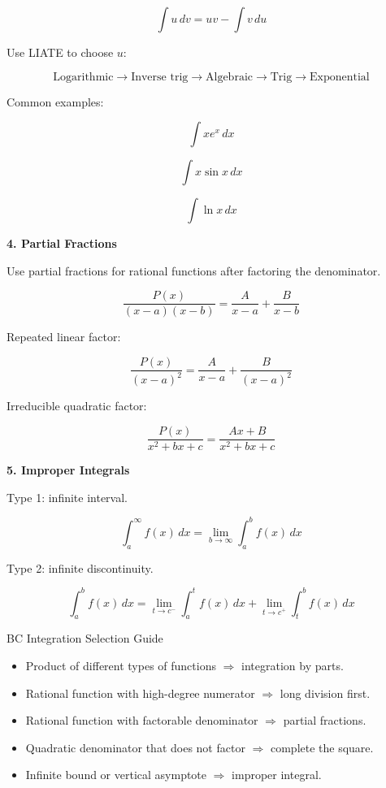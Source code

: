 \documentclass[11pt]{article}
\newcommand{\subtopic}[1]{
\vspace{0.45em}
\textcolor{novelPurpleDark}{\textbf{#1}}
}
\begin{document}
\[
\int u\,dv=uv-\int v\,du
\]

Use LIATE to choose \(u\):

\[
\text{Logarithmic} \to \text{Inverse trig} \to \text{Algebraic} \to \text{Trig} \to \text{Exponential}
\]

Common examples:

\[
\int x e^x\,dx
\]

\[
\int x\sin x\,dx
\]

\[
\int \ln x\,dx
\]

\subtopic{4. Partial Fractions}

Use partial fractions for rational functions after factoring the denominator.

\[
\frac{P(x)}{(x-a)(x-b)}
=
\frac{A}{x-a}+\frac{B}{x-b}
\]

Repeated linear factor:

\[
\frac{P(x)}{(x-a)^2}
=
\frac{A}{x-a}+\frac{B}{(x-a)^2}
\]

Irreducible quadratic factor:

\[
\frac{P(x)}{x^2+bx+c}
=
\frac{Ax+B}{x^2+bx+c}
\]

\subtopic{5. Improper Integrals}

Type 1: infinite interval.

\[
\int_a^\infty f(x)\,dx
=
\lim_{b\to\infty}\int_a^b f(x)\,dx
\]

Type 2: infinite discontinuity.

\[
\int_a^b f(x)\,dx
=
\lim_{t\to c^-}\int_a^t f(x)\,dx+
\lim_{t\to c^+}\int_t^b f(x)\,dx
\]

\begin{warningbox}{BC Integration Selection Guide}
\begin{itemize}[leftmargin=1.5em]
\item Product of different types of functions \(\Rightarrow\) integration by parts.
\item Rational function with high-degree numerator \(\Rightarrow\) long division first.
\item Rational function with factorable denominator \(\Rightarrow\) partial fractions.
\item Quadratic denominator that does not factor \(\Rightarrow\) complete the square.
\item Infinite bound or vertical asymptote \(\Rightarrow\) improper integral.
\end{itemize}
\end{warningbox}

\newpage
\end{document}
